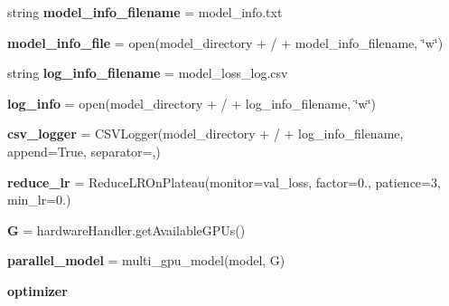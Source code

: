 \begin{DoxyCompactItemize}
string {\bfseries model\+\_\+info\+\_\+filename} = \textquotesingle{}model\+\_\+info.\+txt\textquotesingle{}
\item 
\mbox{\label{namespaceTrainModels_a61a9fe01eefb7883dec4a8152d01ddde}} 
{\bfseries model\+\_\+info\+\_\+file} = open(model\+\_\+directory + \textquotesingle{}/\textquotesingle{} + model\+\_\+info\+\_\+filename, \char`\"{}w\char`\"{})
\item 
\mbox{\label{namespaceTrainModels_af9c0ce73e3d3e5268a5e42722de176c0}} 
string {\bfseries log\+\_\+info\+\_\+filename} = \textquotesingle{}model\+\_\+loss\+\_\+log.\+csv\textquotesingle{}
\item 
\mbox{\label{namespaceTrainModels_a9b47315e4cc6cff4a37c89a32834dcf9}} 
{\bfseries log\+\_\+info} = open(model\+\_\+directory + \textquotesingle{}/\textquotesingle{} + log\+\_\+info\+\_\+filename, \char`\"{}w\char`\"{})
\item 
\mbox{\label{namespaceTrainModels_a809517098c2aa85e7a1c36a3dfc79958}} 
{\bfseries csv\+\_\+logger} = C\+S\+V\+Logger(model\+\_\+directory + \textquotesingle{}/\textquotesingle{} + log\+\_\+info\+\_\+filename, append=True, separator=\textquotesingle{},\textquotesingle{})
\item 
\mbox{\label{namespaceTrainModels_a97b3386fc4c774e4de0153c82d79f9bb}} 
{\bfseries reduce\+\_\+lr} = Reduce\+L\+R\+On\+Plateau(monitor=\textquotesingle{}val\+\_\+loss\textquotesingle{}, factor=0., patience=3, min\+\_\+lr=0.)
\item 
\mbox{\label{namespaceTrainModels_aa04045e6013587a57445ea531a2494a3}} 
{\bfseries G} = hardware\+Handler.\+get\+Available\+G\+P\+Us()
\item 
\mbox{\label{namespaceTrainModels_a933ae8fedd7fe0f9db12ba7e87ea9599}} 
{\bfseries parallel\+\_\+model} = multi\+\_\+gpu\+\_\+model(model, G)
\item 
\mbox{\label{namespaceTrainModels_a7bd18c0ee274c3242b3fd4e910d99ef8}} 
{\bfseries optimizer}
\item 
\mbox{\label{namespaceTrainModels_a1dbfdd998d46b9ad68d8484c195ec7f3}} 

\end{DoxyCompactItemize}
